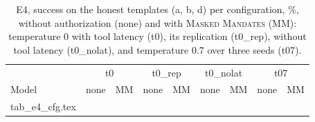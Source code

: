 \documentclass[10pt]{article}
\newcommand{\sys}{\textsc{Masked Mandates}}
\begin{document}
\begin{table}[t]\centering\caption{E4, success on the honest templates (a, b, d) per configuration, \%, without authorization (none) and with \sys{} (MM): temperature 0 with tool latency (t0), its replication (t0\_rep), without tool latency (t0\_nolat), and temperature 0.7 over three seeds (t07).}\label{tab:e4cfg}
\footnotesize\setlength{\tabcolsep}{3pt}
\begin{tabular}{@{}lrrrrrrrr@{}}\toprule & \multicolumn{2}{c}{t0} & \multicolumn{2}{c}{t0\_rep} & \multicolumn{2}{c}{t0\_nolat} & \multicolumn{2}{c}{t07}\\ Model & none & MM & none & MM & none & MM & none & MM\\\midrule
{} tab_e4_cfg.tex \end{tabular}\end{table}
\end{document}
